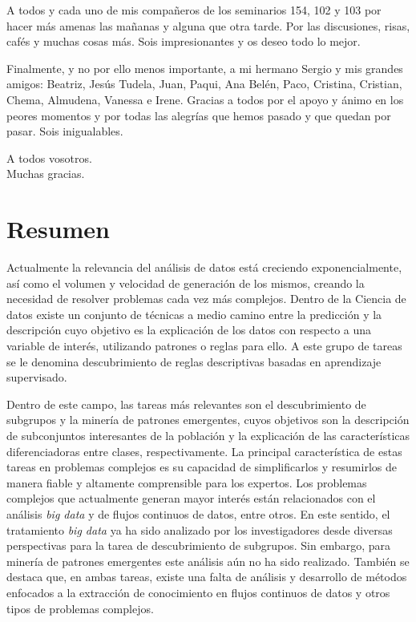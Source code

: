 \documentclass[c5paper,10pt,twoside]{book}	   	%
\begin{document}
A todos y cada uno de mis compañeros de los seminarios 154, 102 y 103 por hacer más amenas las mañanas y alguna que otra tarde. Por las discusiones, risas, cafés y muchas cosas más. Sois impresionantes y os deseo todo lo mejor.

Finalmente, y no por ello menos importante, a mi hermano Sergio y mis grandes amigos: Beatriz, Jesús Tudela, Juan, Paqui, Ana Belén, Paco, Cristina, Cristian, Chema, Almudena, Vanessa e Irene. Gracias a todos por el apoyo y ánimo en los peores momentos y por todas las alegrías que hemos pasado y que quedan por pasar. Sois inigualables.

\vspace{7.5mm}
\begin{flushright}
	A todos vosotros.\\
	Muchas gracias.
\end{flushright}\clearpage{}
\cleardoublepage



\clearpage{}\chapter*{Resumen} 





Actualmente la relevancia del análisis de datos está creciendo exponencialmente, así como el volumen y velocidad de generación de los mismos, creando la necesidad de resolver problemas cada vez más complejos. Dentro de la Ciencia de datos existe un conjunto de técnicas a medio camino entre la predicción y la descripción cuyo objetivo es la explicación de los datos con respecto a una variable de interés, utilizando patrones o reglas para ello. A este grupo de tareas se le denomina descubrimiento de reglas descriptivas basadas en aprendizaje supervisado.

Dentro de este campo, las tareas más relevantes son el descubrimiento de subgrupos y la minería de patrones emergentes, cuyos objetivos son la descripción de subconjuntos interesantes de la población y la explicación de las características diferenciadoras entre clases, respectivamente. La principal característica de estas tareas en problemas complejos es su capacidad de simplificarlos y resumirlos de manera fiable y altamente comprensible para los expertos. Los problemas complejos que actualmente generan mayor interés están relacionados con el análisis \textit{big data} y de flujos continuos de datos, entre otros. En este sentido, el tratamiento \textit{big data} ya ha sido analizado por los investigadores desde diversas perspectivas para la tarea de descubrimiento de subgrupos. Sin embargo, para minería de patrones emergentes este análisis aún no ha sido realizado. También se destaca que, en ambas tareas, existe una falta de análisis y desarrollo de métodos enfocados a la extracción de conocimiento en flujos continuos de datos y otros tipos de problemas complejos.
\end{document}
